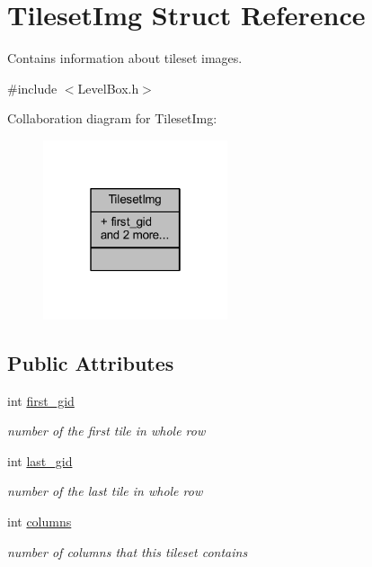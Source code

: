 \hypertarget{struct_tileset_img}{}\section{Tileset\+Img Struct Reference}
\label{struct_tileset_img}


Contains information about tileset images.  




{\ttfamily \#include $<$Level\+Box.\+h$>$}



Collaboration diagram for Tileset\+Img\+:\nopagebreak
\begin{figure}[H]
\begin{center}
\leavevmode
\includegraphics[width=154pt]{struct_tileset_img__coll__graph}
\end{center}
\end{figure}
\subsection*{Public Attributes}
\begin{DoxyCompactItemize}
\item 
\mbox{\label{struct_tileset_img_a5cb5a67d6afd202da1aafd53e509167c}} 
int \hyperlink{struct_tileset_img_a5cb5a67d6afd202da1aafd53e509167c}{first\+\_\+gid}
\begin{DoxyCompactList}\small\item\em number of the first tile in whole row \end{DoxyCompactList}\item 
\mbox{\label{struct_tileset_img_a2cf02afb15fac885b30fd7d4d56374c1}} 
int \hyperlink{struct_tileset_img_a2cf02afb15fac885b30fd7d4d56374c1}{last\+\_\+gid}
\begin{DoxyCompactList}\small\item\em number of the last tile in whole row \end{DoxyCompactList}\item 
\mbox{\label{struct_tileset_img_a9bd1b96e5ce27e6cb778d9fb96138883}} 
int \hyperlink{struct_tileset_img_a9bd1b96e5ce27e6cb778d9fb96138883}{columns}
\begin{DoxyCompactList}\small\item\em number of columns that this tileset contains \end{DoxyCompactList}\end{DoxyCompactItemize}


